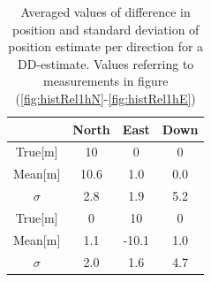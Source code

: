 \begin{table}[!htb]
  \begin{center}
    \begin{tabular}{|c|c|c|c|}\hline
		& \textbf{North} & \textbf{East}& \textbf{Down}\\
      \hline
      True[m]& 10 & 0&0\\ \hline
      Mean[m] &10.6 & 1.0 & 0.0\\ \hline
		$\sigma$& 2.8 & 1.9 & 5.2 \\\hline
		True[m] & 0 &10&0\\ \hline
		Mean[m] & 1.1 & -10.1 & 1.0\\ \hline
		$\sigma$ & 2.0 &1.6 & 4.7 \\
		\hline
    \end{tabular}
    \caption{\label{table:resultsRel} Averaged values of difference in position and standard deviation of position estimate per direction for a DD-estimate. Values referring to measurements in figure (\ref{fig:histRel1hN}-\ref{fig:histRel1hE})}
  \end{center}
\end{table}

